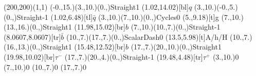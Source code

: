 \documentclass[12pt]{article}
\begin{document}
 
 \thispagestyle{empty}
	
 \begin{feynartspicture}(200,200)(1,1) 
 \FADiagram{} 
\FAProp(-0.,15.)(3.,10.)(0.,){Straight}{1}
\FALabel(1.02,14.02)[bl]{$q$}
\FAProp(3.,10.)(-0.,5.)(0.,){Straight}{-1}
\FALabel(1.02,6.48)[tl]{$\bar{q}$}
\FAProp(3.,10.)(7.,10.)(0.,){Cycles}{0}
\FALabel(5.,9.18)[t]{g}
\FAProp(7.,10.)(13.,16.)(0.,){Straight}{1}
\FALabel(11.98,15.02)[br]{$b$}
\FAProp(7.,10.)(10.,7.)(0.,){Straight}{-1}
\FALabel(8.0607,8.0607)[tr]{$\bar{b}$}
\FAProp(10.,7.)(17.,7.)(0.,){ScalarDash}{0}
\FALabel(13.5,5.98)[t]{A/h/H}
\FAProp(10.,7.)(16.,13.)(0.,){Straight}{1}
\FALabel(15.48,12.52)[br]{$b$}
\FAProp(17.,7.)(20.,10.)(0.,){Straight}{1}
\FALabel(19.98,10.02)[br]{$\tau^-$}
\FAProp(17.,7.)(20.,4.)(0.,){Straight}{-1}
\FALabel(19.48,4.48)[tr]{$\tau^+$}
\FAVert(3.,10.){0}
\FAVert(7.,10.){0}
\FAVert(10.,7.){0}
\FAVert(17.,7.){0}

 
 \end{feynartspicture} 
 
\end{document}
